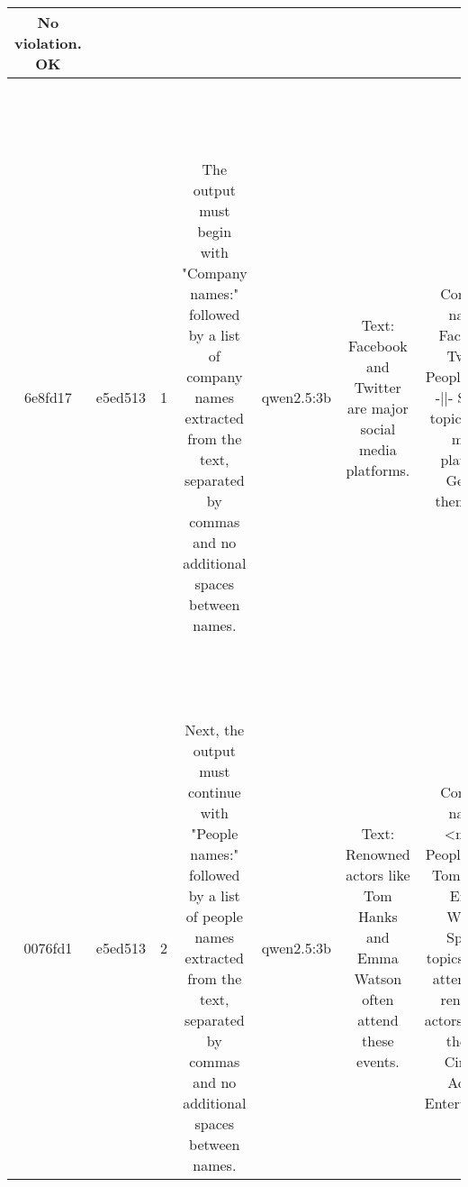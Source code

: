 \begin{table}[h!]
\begin{tabular}{|c|c|c|c|c|c|c|c|c|c|}
No violation.
OK & \\
\hline
6e8fd17 & e5ed513 & 1 & The output must begin with "Company names:" followed by a list of company names extracted from the text, separated by commas and no additional spaces between names. & qwen2.5:3b & Text: Facebook and Twitter are major social media platforms. & Company names: Facebook, Twitter
People names: -||-
Specific topics: social media platforms
General themes: -||- & ok & In evaluating the chatbot output against the description, I observed the following:

1. **Company names** are listed correctly in the format `<comma_separated_list_of_company_names>`. The output lists "Facebook" and "Twitter" which is compliant with the specified format.

2. **People names** section is correctly formatted as `-||-`, indicating no people names were extracted. This complies with the specified format.

3. **Specific topics** are listed which in this case is "social media platforms". The section is formatted correctly as `-||-` when empty or includes topics names separated by commas and this section follows the correct format.

4. **General themes**: This section uses the `-||-` format appropriately to indicate that no general themes were extracted.

All sections use the correct formatting as specified in the description and the output seems to correctly follow the structural layout stipulated. There is no part of the output that violates the description.

No violation.
OK & \\
\hline
0076fd1 & e5ed513 & 2 & Next, the output must continue with "People names:" followed by a list of people names extracted from the text, separated by commas and no additional spaces between names. & qwen2.5:3b & Text: Renowned actors like Tom Hanks and Emma Watson often attend these events. & Company names: <none>
People names: Tom Hanks, Emma Watson
Specific topics: Events attended by renowned actors
General themes: Cinema, Acting, Entertainment & ok & The chatbot's output adheres to the required format established in the description. It follows the sequence of categories: company names, people names, specific topics, and general themes. 

1. **Company names**: The description specifies a comma-separated list of company names. The output states "<none>", which is acceptable.
2. **People names**: The description specifies a comma-separated list, and the output provides: "Tom Hanks, Emma Watson".
3. **Specific topics**: The description specifies a comma-separated list, and the output provides: "Events attended by renowned actors".
4. **General themes**: The description specifies a comma-separated list, and the output provides: "Cinema, Acting, Entertainment".


\end{tabular}
\end{table}
